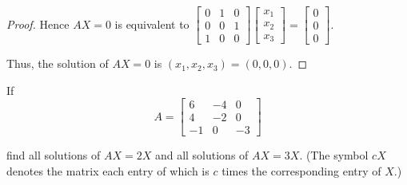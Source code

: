 \begin{proof}
    Hence $AX = 0$ is equivalent to $\begin{bmatrix}0 & 1 & 0 \\ 0 & 0 & 1 \\ 1 & 0 & 0\end{bmatrix}\begin{bmatrix}x_{1} \\ x_{2} \\ x_{3}\end{bmatrix} = \begin{bmatrix}0 \\ 0 \\ 0\end{bmatrix}$.

    Thus, the solution of $AX = 0$ is $(x_{1}, x_{2}, x_{3}) = (0, 0, 0)$.
\end{proof}

\begin{exercise}
    If
    \[
        A =
        \begin{bmatrix}
            6  & -4 & 0  \\
            4  & -2 & 0  \\
            -1 & 0  & -3
        \end{bmatrix}
    \]

    find all solutions of $AX = 2X$ and all solutions of $AX = 3X$. (The symbol $cX$ denotes the matrix each entry of which is $c$ times the corresponding entry of $X$.)
\end{exercise}

